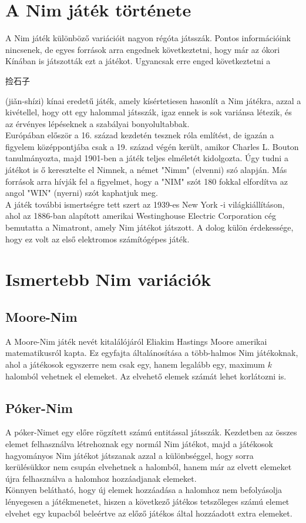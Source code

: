 \section{A Nim játék története}
A Nim játék különböző variációit nagyon régóta játsszák. Pontos információink nincsenek, de egyes források arra engednek következtetni, hogy már az ókori Kínában is játszották ezt a játékot. Ugyancsak erre enged következtetni a \begin{CJK*}{UTF8}{gbsn}捡石子\end{CJK*}
(jiǎn-shízi) kínai eredetű játék, amely kísértetiesen hasonlít a Nim játékra, azzal a kivétellel, hogy ott egy halommal játsszák, igaz ennek is sok variánsa létezik, és az érvényes lépéseknek a szabályai bonyolultabbak. \\
Európában először a 16. század kezdetén tesznek róla említést, de igazán a figyelem középpontjába csak a 19. század végén került, amikor Charles L. Bouton tanulmányozta, majd 1901-ben a játék teljes elméletét kidolgozta. Úgy tudni a játékot is ő keresztelte el Nimnek, a német "Nimm" (elvenni) szó alapján. Más források arra hívják fel a figyelmet, hogy a "NIM" szót 180 fokkal elfordítva az angol "WIN" (nyerni) szót kaphatjuk meg. \\
A játék további ismertségre tett szert az 1939-es New York -i világkiállításon, ahol az 1886-ban alapított amerikai Westinghouse Electric Corporation cég bemutatta a Nimatront, amely Nim játékot játszott. A dolog külön érdekessége, hogy ez volt az első elektromos számítógépes játék.

\section{Ismertebb Nim variációk}
\subsection{Moore-Nim}
A Moore-Nim játék nevét kitalálójáról Eliakim Hastings Moore amerikai matematikusról kapta. Ez egyfajta általánosítása a több-halmos Nim játékoknak, ahol a játékosok egyszerre nem csak egy, hanem legalább egy, maximum $k$ halomból vehetnek el elemeket. Az elvehető elemek számát lehet korlátozni is.

\subsection{Póker-Nim}
A póker-Nimet egy előre rögzített számú entitással játsszák. Kezdetben az összes elemet felhasználva létrehoznak egy normál Nim játékot, majd a játékosok hagyományos Nim játékot játszanak azzal a különbséggel, hogy sorra kerülésükkor nem csupán elvehetnek a halomból, hanem már az elvett elemeket újra felhasználva a halomhoz hozzáadjanak elemeket. \\
Könnyen belátható, hogy új elemek hozzáadása a halomhoz nem befolyásolja lényegesen a játékmenetet, hiszen a következő játékos tetszőleges számú elemet elvehet egy kupacból beleértve az előző játékos által hozzáadott extra elemeket.

